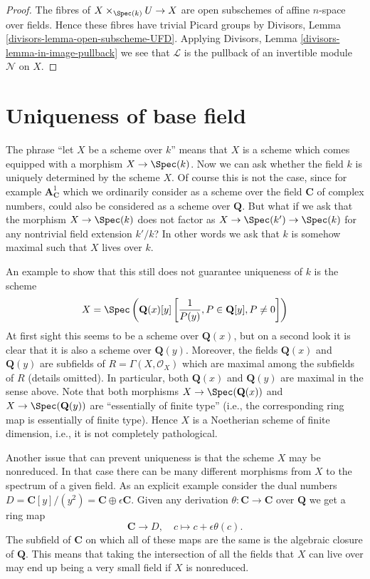 \begin{proof}
The fibres of $X \times_{\Spec(k)} U \to X$ are open subschemes
of affine $n$-space over fields. Hence these fibres have
trivial Picard groups by
Divisors, Lemma \ref{divisors-lemma-open-subscheme-UFD}.
Applying Divisors, Lemma \ref{divisors-lemma-in-image-pullback}
we see that $\mathcal{L}$ is the pullback of an invertible
module $\mathcal{N}$ on $X$.
\end{proof}

\section{Uniqueness of base field}
\label{varieties-section-base-field}
The phrase ``let $X$ be a scheme over $k$'' means that $X$ is a scheme
which comes equipped with a morphism $X \to \Spec(k)$. Now we can
ask whether the field $k$ is uniquely determined by the scheme $X$.
Of course this is not the case, since for example
$\mathbf{A}^1_{\mathbf{C}}$ which we ordinarily consider as a scheme
over the field $\mathbf{C}$ of complex numbers, could also be considered
as a scheme over $\mathbf{Q}$. But what if we ask that the morphism
$X \to \Spec(k)$ does not factor as
$X \to \Spec(k') \to \Spec(k)$ for any nontrivial field
extension $k'/k$? In other words we ask that $k$ is
somehow maximal such that $X$ lives over $k$.

\medskip\noindent
An example to show that this still does not guarantee uniqueness of $k$
is the scheme
$$
X =
\Spec\left(
\mathbf{Q}(x)[y]\left[\frac{1}{P(y)}, P \in \mathbf{Q}[y], P \not = 0\right]
\right)
$$
At first sight this seems to be a scheme over $\mathbf{Q}(x)$, but on a
second look it is clear that it is also a scheme over $\mathbf{Q}(y)$.
Moreover, the fields $\mathbf{Q}(x)$ and $\mathbf{Q}(y)$ are subfields
of $R = \Gamma(X, \mathcal{O}_X)$ which are maximal among the subfields
of $R$ (details omitted). In particular, both $\mathbf{Q}(x)$ and
$\mathbf{Q}(y)$ are maximal in the sense above. Note that both morphisms
$X \to \Spec(\mathbf{Q}(x))$
and $X \to \Spec(\mathbf{Q}(y))$ are ``essentially of finite type''
(i.e., the corresponding ring map is essentially of finite type).
Hence $X$ is a Noetherian scheme of finite dimension, i.e., it is
not completely pathological.

\medskip\noindent
Another issue that can prevent uniqueness is that the scheme $X$ may
be nonreduced. In that case there can be many different morphisms
from $X$ to the spectrum of a given field. As an explicit example consider
the dual numbers
$D = \mathbf{C}[y]/(y^2) = \mathbf{C} \oplus \epsilon \mathbf{C}$.
Given any derivation $\theta : \mathbf{C} \to \mathbf{C}$ over $\mathbf{Q}$
we get a ring map
$$
\mathbf{C} \longrightarrow D, \quad
c \longmapsto c + \epsilon \theta(c).
$$
The subfield of $\mathbf{C}$ on which all of these maps are the same
is the algebraic closure of $\mathbf{Q}$. This means that taking the
intersection of all the fields that $X$ can live over may end up
being a very small field if $X$ is nonreduced.

